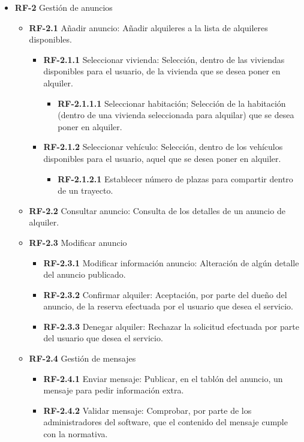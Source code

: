 \documentclass[11pt,spanish]{article} %
\begin{document}
\begin{itemize}
	\item \textbf{RF-2} Gestión de anuncios
	\begin{itemize}
		\item \textbf{RF-2.1} Añadir anuncio: Añadir alquileres a la lista de alquileres disponibles.
		\begin{itemize}
			\item \textbf{RF-2.1.1} Seleccionar vivienda: Selección, dentro de las viviendas disponibles para el usuario, de la vivienda que se desea poner en alquiler.
			\begin{itemize}
				\item \textbf{RF-2.1.1.1} Seleccionar habitación;  Selección de la habitación (dentro de una vivienda seleccionada para alquilar) que se desea poner en alquiler.
			\end{itemize}
			\item \textbf{RF-2.1.2} Seleccionar vehículo: Selección, dentro de los vehículos disponibles para el usuario, aquel que se desea poner en alquiler.
			\begin{itemize}
				\item \textbf{RF-2.1.2.1} Establecer número de plazas para compartir dentro de un trayecto.
			\end{itemize}
		\end{itemize}
		\item \textbf{RF-2.2} Consultar anuncio: Consulta de los detalles de un anuncio de alquiler.
		\item \textbf{RF-2.3} Modificar anuncio
		\begin{itemize}
			\item \textbf{RF-2.3.1} Modificar información anuncio:  Alteración de algún detalle del anuncio publicado.
			\item \textbf{RF-2.3.2} Confirmar alquiler: Aceptación, por parte del dueño del anuncio, de la reserva efectuada por el usuario que desea el servicio.
			\item \textbf{RF-2.3.3} Denegar alquiler: Rechazar la solicitud efectuada por parte del usuario que desea el servicio.
		\end{itemize}
		\item \textbf{RF-2.4} Gestión de mensajes
		\begin{itemize}
			\item \textbf{RF-2.4.1} Enviar mensaje: Publicar, en el tablón del anuncio, un mensaje para pedir información extra.
			\item \textbf{RF-2.4.2} Validar mensaje: Comprobar, por parte de los administradores del software, que el contenido del mensaje cumple con la normativa.

\end{itemize}
\end{itemize}
\end{itemize}
\end{document}

